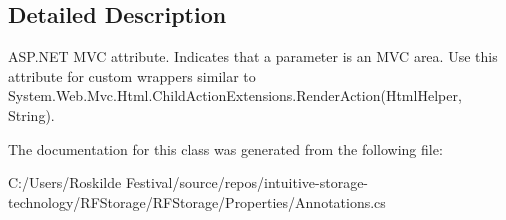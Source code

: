 \subsection{Detailed Description}
A\+S\+P.\+N\+ET M\+VC attribute. Indicates that a parameter is an M\+VC area. Use this attribute for custom wrappers similar to {\ttfamily System.\+Web.\+Mvc.\+Html.\+Child\+Action\+Extensions.\+Render\+Action(\+Html\+Helper, String)}. 



The documentation for this class was generated from the following file\+:\begin{DoxyCompactItemize}
\item 
C\+:/\+Users/\+Roskilde Festival/source/repos/intuitive-\/storage-\/technology/\+R\+F\+Storage/\+R\+F\+Storage/\+Properties/Annotations.\+cs\end{DoxyCompactItemize}
